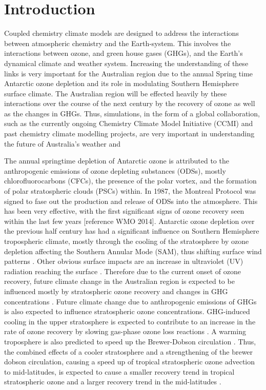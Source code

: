 \section{Introduction} 

Coupled chemistry climate models are designed to address the interactions between atmospheric chemistry and the Earth-system. This involves the interactions between ozone, and green house gases (GHGs), and the Earth's dynamical climate and weather system. Increasing the understanding of these links is very important for the Australian region due to the annual Spring time Antarctic ozone depletion and its role in modulating Southern Hemisphere surface climate. The Australian region will be effected heavily by these interactions over the course of the next century by the recovery of ozone as well as the changes in GHGs. Thus, simulations, in the form of a global collaboration, such as the currently ongoing Chemistry Climate Model Initiative (CCMI) \citep{Eyring:2013tg} and past chemistry climate modelling projects,  are very important in understanding the future of Australia's weather and

The annual springtime depletion of Antarctic ozone is attributed to the anthropogenic emissions of ozone depleting substances (ODSs), mostly chlorofluorocarbons (CFCs), the presence of the polar vortex, and the formation of polar stratospheric clouds (PSCs) within. In 1987, the Montreal Protocol was signed to fase out the production and release of ODSs into the atmosphere. This has been very effective, with the first significant signs of ozone recovery seen within the last few years [reference WMO 2014]. Antarctic ozone depletion over the previous half century has had a significant influence on Southern Hemisphere tropospheric climate, mostly through the cooling of the stratosphere by ozone depletion affecting the Southern Annular Mode (SAM), thus shifting surface wind patterns \citep{Thompson:2011hb}. Other obvious surface impacts are an increase in ultraviolet (UV) radiation reaching the surface \citep{WMO:2011vf}. Therefore due to the current onset of ozone recovery, future climate change in the Australian region is expected to be influenced mostly by stratospheric ozone recovery and changes in GHG concentrations \citep{Arblaster:2011gk}. Future climate change due to anthropogenic emissions of GHGs is also expected to influence stratospheric ozone concentrations. GHG-induced cooling in the upper stratosphere is expected to contribute to an increase in the rate of ozone recovery by slowing gas-phase ozone loss reactions \citep{Barnett:1975eu,Jonsson:2004wb}. A warming troposphere is also predicted to speed up the Brewer-Dobson circulation \citep{Butchart:2006uu}. Thus, the combined effects of a cooler stratosphere and a strengthening of the brewer dobson circulation, causing a speed up of tropical stratospheric ozone advection to mid-latitudes, is expected to cause a smaller recovery trend in tropical stratospheric ozone and a larger recovery trend in the mid-latitudes \citep{Shepherd:2008ws,Li:2009wf}. 

